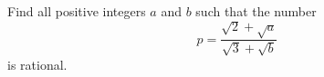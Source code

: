 Find all positive integers $a$ and $b$ such that the number
\[
p=\dfrac{\sqrt2+\sqrt a}{\sqrt3+\sqrt b}
\]
is rational.
